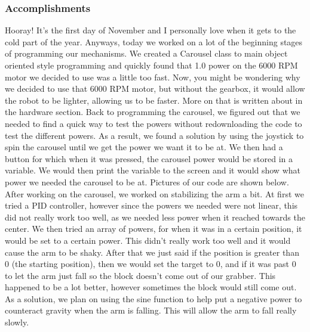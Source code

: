 \subsubsection*{Accomplishments}
Hooray! It’s the first day of November and I personally love when it gets to the cold part of the year. Anyways, today we worked on a lot of the beginning stages of programming our mechanisms. We created a Carousel class to main object oriented style programming and quickly found that 1.0 power on the 6000 RPM motor we decided to use was a little too fast. Now, you might be wondering why we decided to use that 6000 RPM motor, but without the gearbox, it would allow the robot to be lighter, allowing us to be faster. More on that is written about in the hardware section. Back to programming the carousel, we figured out that we needed to find a quick way to test the powers without redownloading the code to test the different powers. As a result, we found a solution by using the joystick to spin the carousel until we get the power we want it to be at. We then had a button for which when it was pressed, the carousel power would be stored in a variable. We would then print the variable to the screen and it would show what power we needed the carousel to be at. Pictures of our code are shown below. After working on the carousel, we worked on stabilizing the arm a bit. At first we tried a PID controller, however since the powers we needed were not linear, this did not really work too well, as we needed less power when it reached towards the center. We then tried an array of powers, for when it was in a certain position, it would be set to a certain power. This didn’t really work too well and it would cause the arm to be shaky. After that we just said if the position is greater than 0 (the starting position), then we would set the target to 0, and if it was past 0 to let the arm just fall so the block doesn’t come out of our grabber. This happened to be a lot better, however sometimes the block would still come out. As a solution, we plan on using the sine function to help put a negative power to counteract gravity when the arm is falling. This will allow the arm to fall really slowly. 

 

